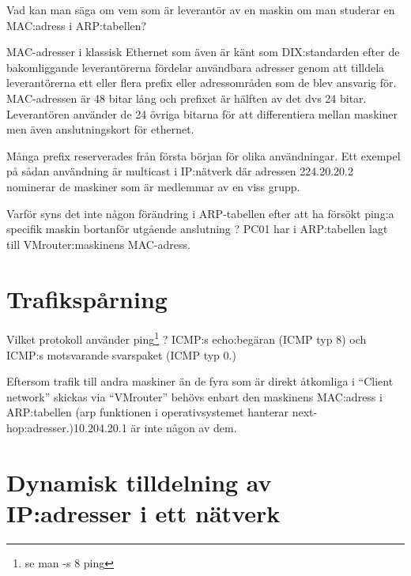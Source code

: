 \documentclass[swedish,10pt,a4paper]{report}
\begin{document}
Vad kan man säga om vem som är leverantör av en maskin om man studerar en MAC:adress i ARP:tabellen?


MAC-adresser i klassisk Ethernet som även är känt som DIX:standarden efter
de bakomliggande leverantörerna fördelar användbara adresser genom att tilldela
leverantörerna ett eller flera prefix eller adressområden som de blev ansvarig för. MAC-adressen är 48 bitar lång
och prefixet är hälften av det dvs 24 bitar. Leverantören använder
de 24 övriga bitarna för att differentiera mellan maskiner men även anslutningskort för ethernet.

Många prefix reserverades från första början för olika användningar. Ett exempel på
sådan användning är multicast i IP:nätverk där adressen 224.20.20.2 nominerar
de maskiner som är medlemmar av en viss grupp.

Varför syns det inte någon förändring i ARP-tabellen efter att
ha försökt ping:a specifik maskin bortanför utgående anslutning ?
PC01 har i ARP:tabellen lagt till VMrouter:maskinens MAC-adress.

\chapter{Trafikspårning}
\label{sec:wireshark_usage}

Vilket protokoll använder ping\footnote{se man -s 8 ping} ? ICMP:s echo:begäran (ICMP typ 8) och ICMP:s motsvarande svarspaket (ICMP typ 0.)

Eftersom trafik till andra maskiner än de fyra som är direkt åtkomliga i ``Client network'' skickas via
``VMrouter'' behövs enbart den maskinens MAC:adress i ARP:tabellen (arp funktionen i operativsystemet hanterar
next-hop:adresser.)\@10.204.20.1 är inte någon av dem.

\chapter{Dynamisk tilldelning av IP:adresser i ett nätverk}\label{chap:dynamisk_adressering}
\end{document}
